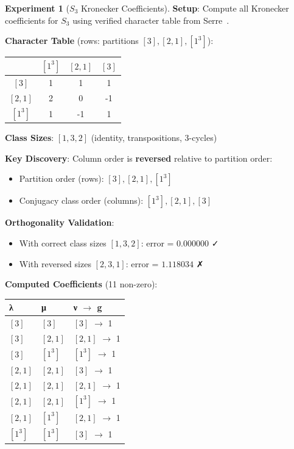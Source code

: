 \documentclass[11pt]{article}
\theoremstyle{definition}
\newtheorem{experiment}[theorem]{Experiment}
\theoremstyle{remark}
\begin{document}
\begin{experiment}[$S_3$ Kronecker Coefficients]\label{exp:s3}
\textbf{Setup}: Compute all Kronecker coefficients for $S_3$ using verified character table from Serre~\cite{serre1977}.

\textbf{Character Table} (rows: partitions $[3], [2,1], [1^3]$):
\begin{center}
\begin{tabular}{c|ccc}
& $[1^3]$ & $[2,1]$ & $[3]$ \\
\hline
$[3]$ & 1 & 1 & 1 \\
$[2,1]$ & 2 & 0 & -1 \\
$[1^3]$ & 1 & -1 & 1 \\
\end{tabular}
\end{center}

\textbf{Class Sizes}: $[1, 3, 2]$ (identity, transpositions, 3-cycles)

\textbf{Key Discovery}: Column order is \textbf{reversed} relative to partition order:
\begin{itemize}
\item Partition order (rows): $[3], [2,1], [1^3]$
\item Conjugacy class order (columns): $[1^3], [2,1], [3]$
\end{itemize}

\textbf{Orthogonality Validation}:
\begin{itemize}
\item With correct class sizes $[1, 3, 2]$: error = $0.000000$ ✓
\item With reversed sizes $[2, 3, 1]$: error = $1.118034$ ✗
\end{itemize}

\textbf{Computed Coefficients} (11 non-zero):
\begin{center}
\small
\begin{tabular}{lll}
\toprule
\textbf{λ} & \textbf{μ} & \textbf{ν} $\to$ \textbf{g} \\
\midrule
$[3]$ & $[3]$ & $[3]$ $\to$ 1 \\
$[3]$ & $[2,1]$ & $[2,1]$ $\to$ 1 \\
$[3]$ & $[1^3]$ & $[1^3]$ $\to$ 1 \\
$[2,1]$ & $[2,1]$ & $[3]$ $\to$ 1 \\
$[2,1]$ & $[2,1]$ & $[2,1]$ $\to$ 1 \\
$[2,1]$ & $[2,1]$ & $[1^3]$ $\to$ 1 \\
$[2,1]$ & $[1^3]$ & $[2,1]$ $\to$ 1 \\
$[1^3]$ & $[1^3]$ & $[3]$ $\to$ 1 \\
\bottomrule
\end{tabular}
\end{center}


\end{experiment}
\end{document}
